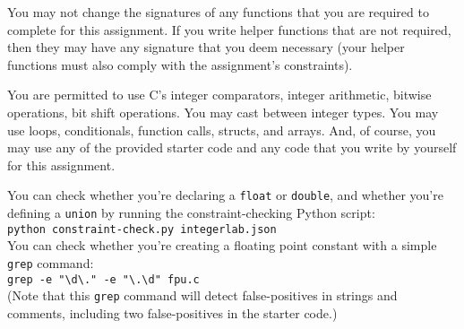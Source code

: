 You may not change the signatures of any functions that you are required to complete for this assignment.
If you write helper functions that are not required, then they may have any signature that you deem necessary
(your helper functions must also comply with the assignment's constraints).

You are permitted to use C's integer comparators, integer arithmetic, bitwise operations, bit shift operations.
You may cast between integer types.
You may use loops, conditionals, function calls, structs, and arrays.
And, of course, you may use any of the provided starter code and any code that you write by yourself for this assignment.

You can check whether you're declaring a \lstinline{float} or \lstinline{double}, and whether you're defining a \lstinline{union} by running the constraint-checking Python script: \\
\texttt{python constraint-check.py integerlab.json} \\
You can check whether you're creating a floating point constant with a simple \texttt{grep} command: \\
\verb#grep -e "\d\." -e "\.\d" fpu.c# \\
(Note that this \texttt{grep} command will detect false-positives in strings and comments, including two false-positives in the starter code.)

